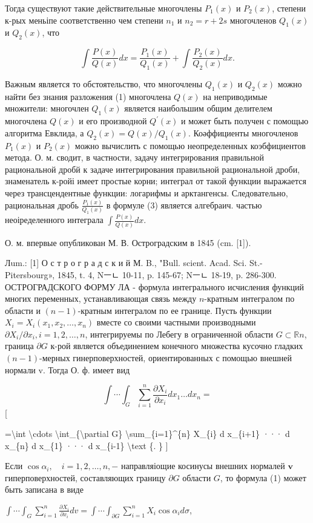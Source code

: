 \documentclass[10pt]{article}
\begin{document}
Тогда существуют такие действительные многочлены $P_{1}(x)$ и $P_{2}(x)$, степени к-рых меньіпе соответственно чем степени $n_{1}$ и $n_{2}=r+2 s$ многочленов $Q_{1}(x)$ и $Q_{2}(x)$, что

\[
\int \frac{P(x)}{Q(x)} d x=\frac{P_{1}(x)}{Q_{1}(x)}+\int \frac{P_{2}(x)}{Q_{2}(x)} d x .
\]

Важным является то обстоятельство, что многочлены $Q_{1}(x)$ и $Q_{2}(x)$ можно найти без знания разложения (1) многочлена $Q(x)$ на неприводимые множители: многочлен $Q_{1}(x)$ является наибольшим общим делителем многочлена $Q(x)$ и его производной $Q^{\prime}(x)$ и может быть получен с помощью алгоритма Евклида, а $Q_{2}(x)=Q(x) / Q_{1}(x)$. Коәффициенты многочленов $P_{1}(x)$ и $P_{2}(x)$ можно вычислить с помощью неопределенных коэбфициентов метода. О. м. сводит, в частности, задачу интегрирования правильной рациональной дробй к задаче интегрирования правильной рациональной дроби, знаменатель к-ройі имеет простые корни; интеграл от такой функции выражается через трансцендентные функции: логарифмы и арктангенсы. Следовательно, рациональная дробь $\frac{P_{1}(x)}{Q_{1}(x)}$ в формуле (3) является алгебраич. частью неоіределенного интеграла $\int \frac{P(x)}{Q(x)} d x$.

О. м. впервые опубликован М. В. Остроградским в 1845 (cm. [1]).

Лum.: [1] О с т р о г р а д с к и й М. B., "Bull. scient. Acad. Sci. St.-Pitersbourg», 1845, t. 4, Nㅡㄴ 10-11, p. 145-67; Nㅡㄴ 18-19,
p. 286-300. ОСТРОГРАДСКОГО ФОРМУ ЛА - формула интегрального исчисления функций многих переменных, устанавливающая связь между $n$-кратным интегралом по области и $(n-1)$-кратным интегралом по ее границе. Пусть функции $X_{i}=X_{i}\left(x_{1}, x_{2}, \ldots, x_{n}\right)$ вместе со своими частными производными $\partial X_{i} / \partial x_{i}, i=1,2, \ldots, n$, интегрируемы по Лебегу в ограниченной области $G \subset \mathbb{R} n$, граница $\partial G$ к-рой является объединением конечного множества кусочно гладких $(n-1)$-мерных гинерповерхностей, ориентированных с помощью внешней нормали v. Тогда О. ф. имеет вид

\[
\int \cdots \int_{G} \sum_{i=1}^{n} \frac{\partial X_{i}}{\partial x_{i}} d x_{1} \ldots d x_{n}=
\][

=\textbackslash int \textbackslash cdots \textbackslash int\_\{\textbackslash partial G\} \textbackslash sum\_\{i=1\}\^{}\{n\} X\_\{i\} d x\_\{i+1\} ··· d x\_\{n\} d x\_\{1\} ··· d x\_\{i-1\} \textbackslash text \{. \}
]

Если $\cos \alpha_{i}, \quad i=1,2, \ldots, n,-$ направляіощие косинусы внешних нормалей $\boldsymbol{v}$ гиперповерхностей, составляющих границу $\partial G$ области $G$, то формула (1) может быть записана в виде

$\int \cdots \int_{G} \sum_{i=1}^{n} \frac{\partial X_{i}}{\partial x_{i}} d v=\int \cdots \int_{\partial G} \sum_{i=1}^{n} X_{i} \cos \alpha_{i} d \sigma$,
\end{document}
